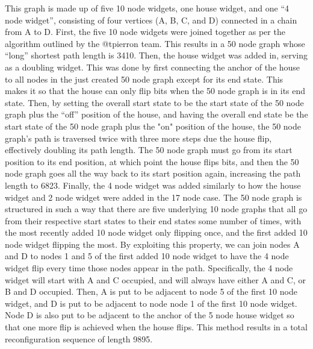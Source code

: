 \documentclass{article}
\begin{document}
This graph is made up of five 10 node widgets, one house widget, and one ``4 node widget'', consisting of four vertices (A, B, C, and D) connected in a chain from A to D. First, the five 10 node widgets were joined together as per the algorithm outlined by the @tpierron team. This results in a 50 node graph whose ``long'' shortest path length is 3410. Then, the house widget was added in, serving as a doubling widget. This was done by first connecting the anchor of the house to all nodes in the just created 50 node graph except for its end state. This makes it so that the house can only flip bits when the 50 node graph is in its end state. Then, by setting the overall start state to be the start state of the 50 node graph plus the ``off'' position of the house, and having the overall end state be the start state of the 50 node graph plus the "on" position of the house, the 50 node graph's path is traversed twice with three more steps due the house flip, effectively doubling its path length. The 50 node graph must go from its start position to its end position, at which point the house flips bits, and then the 50 node graph goes all the way back to its start position again, increasing the path length to 6823. Finally, the 4 node widget was added similarly to how the house widget and 2 node widget were added in the 17 node case. The 50 node graph is structured in such a way that there are five underlying 10 node graphs that all go from their respective start states to their end states some number of times, with the most recently added 10 node widget only flipping once, and the first added 10 node widget flipping the most. By exploiting this property, we can join nodes A and D to nodes 1 and 5 of the first added 10 node widget to have the 4 node widget flip every time those nodes appear in the path. Specifically, the 4 node widget will start with A and C occupied, and will always have either A and C, or B and D occupied. Then, A is put to be adjacent to node 5 of the first 10 node widget, and D is put to be adjacent to node node 1 of the first 10 node widget. Node D is also put to be adjacent to the anchor of the 5 node house widget so that one more flip is achieved when the house flips. This method results in a total reconfiguration sequence of length 9895.
\end{document}
